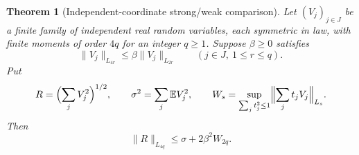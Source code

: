 \documentclass[11pt]{article}
\newtheorem{theorem}{Theorem}[section]
\theoremstyle{definition}
\theoremstyle{remark}
\newcommand{\E}{\mathbb E}
\newcommand{\norm}[1]{\lVert#1\rVert}
\begin{document}
\begin{theorem}[Independent-coordinate strong/weak comparison]
\label{mi32-hilbert-comparison}
Let $(V_j)_{j\in J}$ be a finite family of independent real random
variables, each symmetric in law, with finite moments of order $4q$ for
an integer $q\ge1$. Suppose $\beta\ge0$ satisfies
\begin{equation}\label{mi32-coordinate-regularity}
 \norm{V_j}_{L_{4r}}\le\beta\norm{V_j}_{L_{2r}}
 \qquad(j\in J,\ 1\le r\le q).
\end{equation}
Put
\[
 R=\Bigl(\sum_jV_j^2\Bigr)^{1/2},\qquad
 \sigma^2=\sum_j\E V_j^2,\qquad
 W_s=\sup_{\sum_jt_j^2\le1}
        \Bigl\|\sum_jt_jV_j\Bigr\|_{L_s}.
\]
Then
\begin{equation}\label{mi32-hilbert-comparison-bound}
 \norm{R}_{L_{4q}}\le\sigma+2\beta^2W_{2q}.
\end{equation}
\end{theorem}
\end{document}
